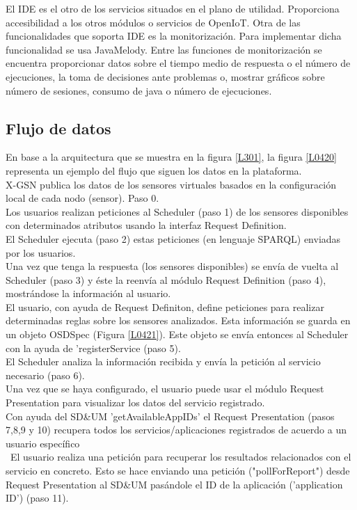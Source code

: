 \documentclass[12pt, twoside]{book}
\begin{document}
El IDE es el otro de los servicios situados en el plano de utilidad. Proporciona accesibilidad a los otros módulos o servicios de OpenIoT.
Otra de las funcionalidades que soporta IDE es la monitorización. Para implementar dicha funcionalidad se usa JavaMelody. Entre las funciones de monitorización se encuentra proporcionar datos sobre el tiempo medio de respuesta o el número de ejecuciones, la toma de decisiones ante problemas o, mostrar gráficos sobre número de sesiones, consumo de java o número de ejecuciones.

\subsection{Flujo de datos}
En base a la arquitectura que se muestra en la figura \ref{L301}, la figura \ref{L0420} representa un ejemplo del flujo que siguen los datos en la plataforma. \\
X-GSN publica los datos de los sensores virtuales basados en la configuración local de cada nodo (sensor). Paso 0. \\
Los usuarios realizan peticiones al Scheduler (paso 1) de los sensores disponibles con determinados atributos usando la interfaz Request Definition.\\
El Scheduler ejecuta (paso 2) estas peticiones (en lenguaje SPARQL) enviadas por los usuarios.\\
Una vez que tenga la respuesta (los sensores disponibles) se envía de vuelta al Scheduler (paso 3) y éste la reenvía al módulo Request Definition (paso 4), mostrándose la información al usuario.\\
El usuario, con ayuda de Request Definiton, define peticiones para  realizar determinadas reglas sobre los sensores analizados. Esta información se guarda en un objeto OSDSpec (Figura \ref{L0421}). Este objeto se envía entonces al Scheduler con la ayuda de 'registerService (paso 5).\\
El Scheduler analiza la información recibida y envía la petición al servicio necesario (paso 6).\\
Una vez que se haya configurado, el usuario puede usar el módulo Request Presentation para visualizar los datos del servicio registrado.\\
Con ayuda del SD\&UM 'getAvailableAppIDs' el Request Presentation (pasos 7,8,9 y 10) recupera todos los servicios/aplicaciones registrados de acuerdo a un usuario específico\\\
El usuario realiza una petición para recuperar los resultados relacionados con el servicio en concreto. Esto se hace enviando una petición ("pollForReport") desde Request Presentation al SD\&UM pasándole el ID de la aplicación ('application ID') (paso 11).\\
\end{document}
